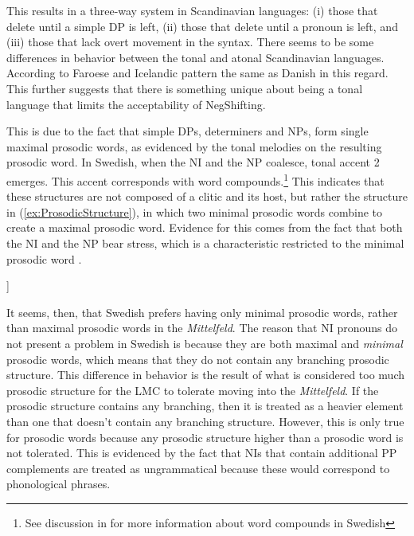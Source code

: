\documentclass[12pt, letterpaper]{article}
\begin{document}
This results in a three-way system in Scandinavian languages: (i) those that delete until a simple DP is left, (ii) those that delete until a pronoun is left, and (iii) those that lack overt movement in the syntax. There seems to be some differences in behavior between the tonal and atonal Scandinavian languages. According to \citet{thrainssonFaroeseOverviewReference2004,thrainssonSyntaxIcelandic2010} Faroese and Icelandic pattern the same as Danish in this regard. This further suggests that there is something unique about being a tonal language that limits the acceptability of NegShifting.

This is due to the fact that simple DPs, determiners and NPs, form single maximal prosodic words, as evidenced by the tonal melodies on the resulting prosodic word. In Swedish, when the NI and the NP coalesce, tonal accent 2 emerges. This accent corresponds with word compounds.\footnote{See discussion in \cite{myrbergProsodicWordSwedish2013,myrbergProsodicHierarchySwedish2015} for more information about word compounds in Swedish} This indicates that these structures are not composed of a clitic and its host, but rather the structure in (\ref{ex:ProsodicStructure}), in which two minimal prosodic words combine to create a maximal prosodic word. Evidence for this comes from the fact that both the NI and the NP bear stress, which is a characteristic restricted to the minimal prosodic word \citep{myrbergProsodicWordSwedish2013,myrbergProsodicHierarchySwedish2015}. 
\ea \label{ex:ProsodicStructure}
\begin{forest}
	[$\omega_{max}$
		[$\omega_{min}$\\\emph{inga}] [$\omega_{min}$\\\emph{grottor}]
	]
\end{forest} 
\z 

It seems, then, that Swedish prefers having only minimal prosodic words, rather than maximal prosodic words in the \emph{Mittelfeld}. The reason that NI pronouns do not present a problem in Swedish is because they are both maximal and \emph{minimal} prosodic words, which means that they do not contain any branching prosodic structure. This difference in behavior is the result of what is considered too much prosodic structure for the LMC to tolerate moving into the \emph{Mittelfeld}. If the prosodic structure contains any branching, then it is treated as a heavier element than one that doesn't contain any branching structure. However, this is only true for prosodic words because any prosodic structure higher than a prosodic word is not tolerated. This is evidenced by the fact that NIs that contain additional PP complements are treated as ungrammatical because these would correspond to phonological phrases. 
\end{document}

